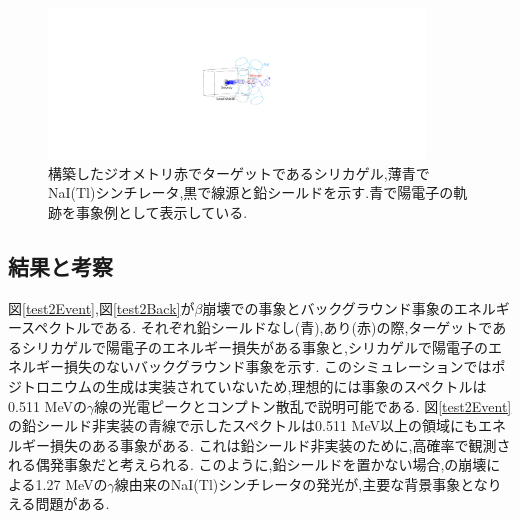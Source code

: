 \begin{figure}[!tbp]
	\centering
		\includegraphics[width=10cm]{img/test2_geometry.pdf}
	\caption[構築したジオメトリ]{構築したジオメトリ\newline 赤でターゲットであるシリカゲル,薄青でNaI(Tl)シンチレータ,黒で線源と鉛シールドを示す.青で陽電子の軌跡を事象例として表示している.}
	\label{test2_geometry}
\end{figure}

\subsection{結果と考察}

図\ref{test2Event},図\ref{test2Back}が$\beta$崩壊での事象とバックグラウンド事象のエネルギースペクトルである.
それぞれ鉛シールドなし(青),あり(赤)の際,ターゲットであるシリカゲルで陽電子のエネルギー損失がある事象と,シリカゲルで陽電子のエネルギー損失のないバックグラウンド事象を示す.
このシミュレーションではポジトロニウムの生成は実装されていないため,理想的には事象のスペクトルは0.511 MeVの$\gamma$線の光電ピークとコンプトン散乱で説明可能である.
図\ref{test2Event}の鉛シールド非実装の青線で示したスペクトルは0.511 MeV以上の領域にもエネルギー損失のある事象がある.
これは鉛シールド非実装のために,高確率で観測される偶発事象だと考えられる.
このように,鉛シールドを置かない場合,の崩壊による1.27 MeVの$\gamma$線由来のNaI(Tl)シンチレータの発光が,主要な背景事象となりえる問題がある.

